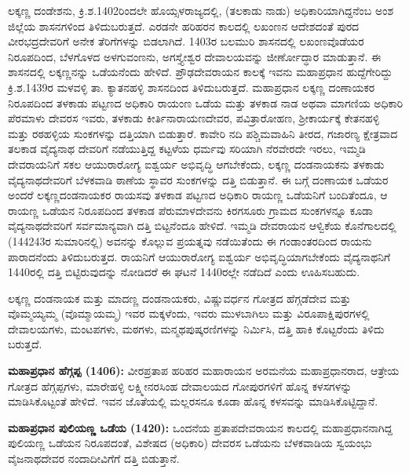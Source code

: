 ಲಕ್ಕಣ್ಣ ದಂಡೇಶನು, ಕ್ರಿ.ಶ.1402ರಿಂದಲೇ ಹೊಯ್ಸಳರಾಜ್ಯದಲ್ಲಿ, (ತಲಕಾಡು ನಾಡು) ಅಧಿಕಾರಿಯಾಗಿದ್ದನೆಂಬ ಅಂಶ ಜಿಲ್ಲೆಯ ಶಾಸನಗಳಿಂದ ತಿಳಿದುಬರುತ್ತದೆ. ಎರಡನೇ ಹರಿಹರನ ಕಾಲದಲ್ಲಿ ಲಖಂಣನ ಆದೇಶದಂತೆ ಪುರದ ವೀರಭದ್ರದೇವರಿಗೆ ಅನೇಕ ತೆರಿಗೆಗಳನ್ನು ಬಿಡಲಾಗಿದೆ. 1403ರ ಬಲಮುರಿ ಶಾಸನದಲ್ಲಿ ಲಖಂಣವೊಡೆಯರ ನಿರೂಪದಿಂದ, ಬೆಳಗೊಳದ ಅಳಗುವಂಣನು, ಅಗಸ್ತ್ಯೇಶ್ವರ ದೇವಾಲಯವನ್ನು ಜೀರ್ಣೋದ್ಧಾರ ಮಾಡುತ್ತಾನೆ. ಈ ಶಾಸನದಲ್ಲಿ ಲಕ್ಕಣ್ಣನನ್ನು ಒಡೆಯನೆಂದು ಹೇಳಿದೆ. ಪ್ರೌಢದೇವರಾಯನ ಕಾಲಕ್ಕೆ ಇವನು ಮಹಾಪ್ರಧಾನ ಹುದ್ದೆಗೇರಿದ್ದು ಕ್ರಿ.ಶ.1439ರ ಮಳವಳ್ಳಿ ತಾ. ಕ್ಯಾತನಹಳ್ಳಿ ಶಾಸನದಿಂದ ತಿಳಿದುಬರುತ್ತದೆ. ಮಹಾಪ್ರಧಾನ ಲಕ್ಕಣ್ಣ ದಂಣಾಯಕರ ನಿರೂಪದಿಂದ ತಳಕಾಡು ಪಟ್ಟಣದ ಅಧಿಕಾರಿ ರಾಯಂಣ ಒಡೆಯ ಮತ್ತು ತಳಕಾಡ ನಾಡ ಅಥವಾ ಮಾಗಣಿಯ ಅಧಿಕಾರಿ ಪೆರಮಾಳು ದೇವರಸ ಇವರು, ತಳಕಾಡು ಕೀರ್ತಿನಾರಾಯಣದೇವರ, ಪವಿತ್ರಾರೋಹಣ, ಶ‍್ರೀಕಾರ್ಯಕ್ಕೆ ಕೇತನಹಳ್ಳಿ ಮತ್ತು ರಠಹಳ್ಳಿಯ ಸುಂಕಗಳನ್ನು ದತ್ತಿಯಾಗಿ ಬಿಡುತ್ತಾರೆ. ಕಾವೇರಿ ನದಿ ಪಶ್ಚಿಮವಾಹಿನಿ ತೀರದ, ಗಜಾರಣ್ಯ ಕ್ಷೇತ್ರವಾದ ತಲಕಾಡ ವೈದ್ಯನಾಥ ದೇವರಿಗೆ ನಡೆಯುತ್ತಿದ್ದ ಕಟ್ಟಳೆಯ ಧರ್ಮವು ಸರಿಯಾಗಿ ನೆರವೇರದೇ ಇರಲು, ಇಮ್ಮಡಿ ದೇವರಾಯನಿಗೆ ಸಕಲ ಆಯುರಾರೋಗ್ಯ ಐಶ್ವರ್ಯ ಅಭಿವೃದ್ಧಿ ಆಗಬೇಕೆಂದು, ಲಕ್ಕಣ್ಣ ದಂಡನಾಯಕನು ತಳಕಾಡು ವೈದ್ಯನಾಥದೇವರಿಗೆ ಬೆಳಕವಾಡಿ ಠಾಣೆಯ ಸ್ಥಾವರ ಸುಂಕಗಳನ್ನು ದತ್ತಿ ಬಿಡುತ್ತಾನೆ. ಈ ಬಗ್ಗೆ ದಂಣಾಯಕ ಒಡೆಯರ ಅಂದರೆ ಲಕ್ಕಣ್ಣದಂಡನಾಯಕರ ರಾಯಸವು ತಳಕಾಡ ಪಟ್ಟಣದ ಅಧಿಕಾರಿ ರಾಯಣ್ಣ ಒಡೆಯನಿಗೆ ಬಂದಿತೆಂದೂ, ಆ ರಾಯಣ್ಣ ಒಡೆಯನ ನಿರೂಪದಿಂದ ತಳಕಾಡ ಪೆರುಮಾಳದೇವನು ಕಿರಗಸೂರು ಗ್ರಾಮದ ಸುಂಕಗಳನ್ನೂ ಕೂಡಾ ವೈದ್ಯನಾಥದೇವರಿಗೆ ಸರ್ವಮಾನ್ಯವಾಗಿ ದತ್ತಿ ಬಿಟ್ಟನೆಂದೂ ಹೇಳಿದೆ. ಇಮ್ಮಡಿ ದೇವರಾಯನ ಆಳ್ವಿಕೆಯ ಕೊನೆಗಾಲದಲ್ಲಿ (1442\enginline{-}43ರ ಸುಮಾರಿನಲ್ಲಿ) ಅವನನ್ನು ಕೊಲ್ಲುವ ಪ್ರಯತ್ನವು ನಡೆಯಿತೆಂದು ಈ ಗಂಡಾಂತರದಿಂದ ರಾಯನು ಪಾರಾದನೆಂದು ತಿಳಿದುಬರುತ್ತದ. ರಾಯನಿಗೆ ಆಯುರಾರೋಗ್ಯ ಐಶ್ವರ್ಯ ಅಭಿವೃದ್ಧಿಯಾಗಬೇಕೆಂದು ವೈದ್ಯನಾಥನಿಗೆ 1440ರಲ್ಲಿ ದತ್ತಿ ಬಿಟ್ಟಿರುವುದನ್ನು ನೋಡಿದರೆ ಈ ಘಟನೆ 1440ರಲ್ಲೇ ನಡೆದಿದೆ ಎಂದು ಊಹಿಸಬಹುದು.

ಲಕ್ಕಣ್ಣ ದಂಡನಾಯಕ ಮತ್ತು ಮಾದಣ್ಣ ದಂಡನಾಯಕರು, ವಿಷ್ಣುವರ್ಧನ ಗೋತ್ರದ ಹೆಗ್ಗಡೆದೇವ ಮತ್ತು ವೊಮ್ಮಯ್ಯಮ್ಮ (ವೊಮ್ಮಾಯಮ್ಮ) ಇವರ ಮಕ್ಕಳೆಂದು, ಇವರು ಮುಳಬಾಗಿಲು ಮತ್ತು ವಿರೂಪಾಕ್ಷಿಪುರಗಳಲ್ಲಿ ದೇವಾಲಯಗಳು, ಮಂಟಪಗಳು, ಮಠಗಳು, ಮನ್ಮಥಪುಷ್ಕರಣಿಗಳನ್ನು ನಿರ್ಮಿಸಿ, ದತ್ತಿ ಹಾಕಿ ಕೊಟ್ಟರೆಂದು ತಿಳಿದು ಬರುತ್ತದೆ.

\textbf{ಮಹಾಪ್ರಧಾನ ಹೆಗ್ಗಪ್ಪ (1406):} ವೀರಪ್ರತಾಪ ಹರಿಹರ ಮಹಾರಾಯನ ಅರಮನೆಯ ಮಹಾಪ್ರಧಾನರಾದ, ಆತ್ರೇಯ ಗೋತ್ರದ ಹೆಗ್ಗಪ್ಪಗಳು, ಮಾರೇಹಳ್ಳಿ ಲಕ್ಷ್ಮೀನರಸಿಂಹ ದೇವಾಲಯದ ಗೋಪುರಗಳಿಗೆ ಹೊನ್ನ ಕಳಸಗಳನ್ನು ಮಾಡಿಸಿಕೊಟ್ಟಂತೆ ಹೇಳಿದೆ. ಇವನ ಜೊತೆಯಲ್ಲಿ ಮಲ್ಲರಸನೂ ಕೂಡಾ ಹೊನ್ನ ಕಳಸವನ್ನು ಮಾಡಿಸಿಕೊಟ್ಟಿದ್ದಾನೆ.

\textbf{ಮಹಾಪ್ರಧಾನ ಪುಲಿಯಣ್ಣ ಒಡೆಯ (1420):} ಒಂದನೆಯ ಪ್ರತಾಪದೇವರಾಯನ ಕಾಲದಲ್ಲಿ ಮಹಾಪ್ರಧಾನ\-ನಾಗಿದ್ದ ಪುಲಿಯಣ್ಣ ಒಡೆಯನ ನಿರೂಪದಂತೆ, ವಿಶೇಷದ (ಅಧಿಕಾರಿ) ದೇವರಸ ಒಡೆಯನು ಬೆಳಕವಾಡಿಯ ಸ್ವಯಂಭು ವೈಜನಾಥದೇವರ ನಂದಾದೀವಿಗೆಗೆ ದತ್ತಿ ಬಿಡುತ್ತಾನೆ.

